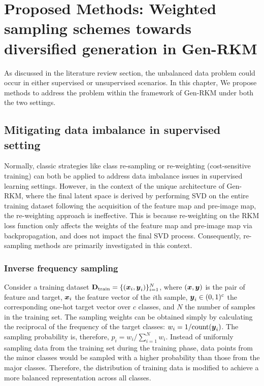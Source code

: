 \chapter[Proposed Methods]{Proposed Methods: Weighted sampling schemes towards diversified generation in Gen-RKM}
\label{chap-methods}
As discussed in the literature review section, the unbalanced data problem could occur in either supervised or unsupervised scenarios. In this chapter, We propose methods to address the problem within the framework of Gen-RKM under both the two settings.


\section{Mitigating data imbalance in supervised setting}
\label{sec-methods-supervised}
Normally, classic strategies like class re-sampling or re-weighting (cost-sensitive training) can both be applied to address data imbalance issues in supervised learning settings. However, in the context of the unique architecture of Gen-RKM, where the final latent space is derived by performing SVD on the entire training dataset following the acquisition of the feature map and pre-image map, the re-weighting approach is ineffective. This is because re-weighting on the RKM loss function only affects the weights of the feature map and pre-image map via backpropagation, and does not impact the final SVD process. Consequently, re-sampling methods are primarily investigated in this context.

\subsection{Inverse frequency sampling}
Consider a training dataset $\mathbf{D}_{\text{train}} = \{ (\boldsymbol{x}_i, \boldsymbol{y}_i) \}_{i=1}^N$, where $(\boldsymbol{x}, \boldsymbol{y})$ is the pair of feature and target, $\boldsymbol{x}_i$ the feature vector of the $i$th sample, $\boldsymbol{y}_i \in (0, 1)^c$ the corresponding one-hot target vector over $c$ classes, and $N$ the number of samples in the training set. The sampling weights can be obtained simply by calculating the reciprocal of the frequency of the target classes: $w_i = 1/\text{count}(\boldsymbol{y}_i)$. The sampling probability is, therefore, $p_i=w_i/\sum_{i=1}^N w_i$. Instead of uniformly sampling data from the training set during the training phase, data points from the minor classes would be sampled with a higher probability than those from the major classes. Therefore, the distribution of training data is modified to achieve a more balanced representation across all classes.

